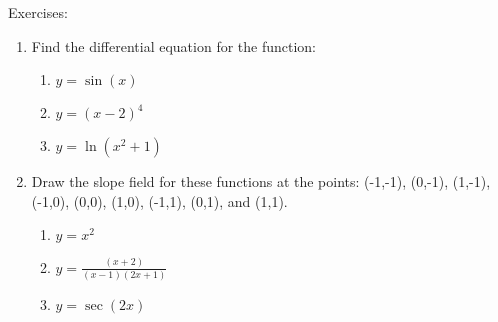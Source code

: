 \documentclass[../revisedmain.tex]{subfiles}
\begin{document}
\begin{center}
	\LARGE Exercises:
\end{center}
\begin{enumerate}
	\item Find the differential equation for the function:
	\begin{enumerate}
		\item $y=\sin(x)$
		\item $y=(x-2)^4$
		\item $y=\ln(x^2+1)$
	\end{enumerate}
	\item Draw the slope field for these functions at the points: (-1,-1), (0,-1), (1,-1), (-1,0), (0,0), (1,0), (-1,1), (0,1), and (1,1).
	\begin{enumerate}
		\item $y=x^2$
		\item $y=\displaystyle\frac{(x+2)}{(x-1)(2x+1)}$
		\item $y=\sec(2x)$
	\end{enumerate}
\end{enumerate}
\end{document}
